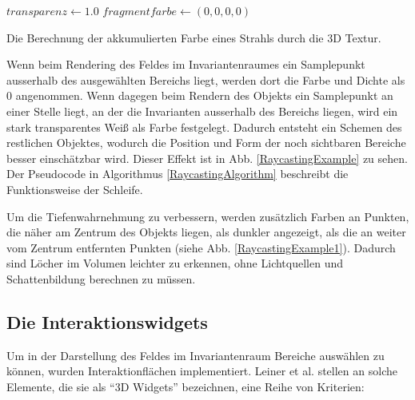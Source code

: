 \documentclass[a4paper,fontsize=12pt,toc=bib,halfparskip]{scrartcl}
\begin{document}
\begin{algorithm}[t]
	$transparenz\gets 1.0$\;
	$fragmentfarbe\gets (0, 0, 0, 0)$\;
	\vspace{0.5cm}
	\caption{Die Berechnung der akkumulierten Farbe eines Strahls durch die 3D Textur.}
	\label{RaycastingAlgorithm}
\end{algorithm}

Wenn beim Rendering des Feldes im Invariantenraumes ein Samplepunkt ausserhalb des ausgew\"ahlten Bereichs liegt, werden dort die Farbe und Dichte als 0 angenommen. Wenn dagegen beim Rendern des Objekts ein Samplepunkt an einer Stelle liegt, an der die Invarianten ausserhalb des Bereichs liegen, wird ein stark transparentes Wei{\ss} als Farbe festgelegt. Dadurch entsteht ein Schemen des restlichen Objektes, wodurch die Position und Form der noch sichtbaren Bereiche besser einsch\"atzbar wird. Dieser Effekt ist in Abb. \ref{RaycastingExample} zu sehen. Der Pseudocode in Algorithmus \ref{RaycastingAlgorithm} beschreibt die Funktionsweise der Schleife.

Um die Tiefenwahrnehmung zu verbessern, werden zus\"atzlich Farben an Punkten, die n\"aher am Zentrum des Objekts liegen, als dunkler angezeigt, als die an weiter vom Zentrum entfernten Punkten (siehe Abb. \ref{RaycastingExample1}). Dadurch sind L\"ocher im Volumen leichter zu erkennen, ohne Lichtquellen und Schattenbildung berechnen zu m\"ussen.


\subsection{Die Interaktionswidgets}
\label{sec:Widget}
Um in der Darstellung des Feldes im Invariantenraum Bereiche ausw\"ahlen zu k\"onnen, wurden Interaktionfl\"achen implementiert. Leiner et al. \cite{leiner1997entwicklung} stellen an solche Elemente, die sie als ``3D Widgets'' bezeichnen, eine Reihe von Kriterien:
\end{document}

